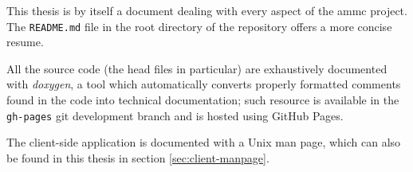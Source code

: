 This thesis is by itself a document dealing with every aspect of the ammc
project. The \texttt{README.md} file in the root directory of the repository
offers a more concise resume.

All the source code (the head files in particular) are exhaustively documented
with \emph{doxygen}, a tool which automatically converts properly formatted
comments found in the code into technical documentation; such resource is
available in the \texttt{gh-pages} git development branch and is hosted using
GitHub Pages.

The client-side application is documented with a Unix man page, which can also
be found in this thesis in section \ref{sec:client-manpage}.

